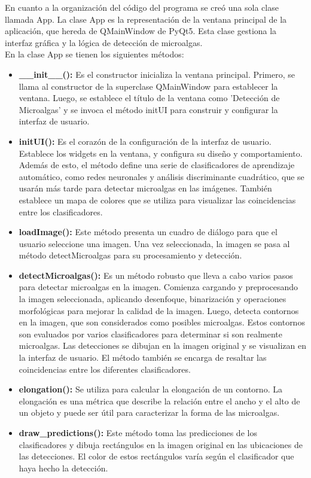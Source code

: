 \documentclass[conference]{IEEEtran}
\begin{document}
En cuanto a la organización del código del programa se creó una sola clase llamada App. La clase App es la representación de la ventana principal de la aplicación, que hereda de QMainWindow de PyQt5. Esta clase gestiona la interfaz gráfica y la lógica de detección de microalgas.\\
En la clase App se tienen los siguientes métodos:
\begin{itemize}
    \item \textbf{\_\_init\_\_(): }Es el constructor inicializa la ventana principal. Primero, se llama al constructor de la superclase QMainWindow para establecer la ventana. Luego, se establece el título de la ventana como 'Detección de Microalgas' y se invoca el método initUI para construir y configurar la interfaz de usuario.
    \item \textbf{initUI(): }Es el corazón de la configuración de la interfaz de usuario. Establece los  widgets en la ventana, y configura su diseño y comportamiento. Además de esto, el método define una serie de clasificadores de aprendizaje automático, como redes neuronales y análisis discriminante cuadrático, que se usarán más tarde para detectar microalgas en las imágenes. También establece un mapa de colores que se utiliza para visualizar las coincidencias entre los clasificadores.
    \item \textbf{loadImage(): } Este método presenta un cuadro de diálogo para que el usuario seleccione una imagen. Una vez seleccionada, la imagen se pasa al método detectMicroalgas para su procesamiento y detección.
    \item \textbf{detectMicroalgas(): }Es un método robusto que lleva a cabo varios pasos para detectar microalgas en la imagen. Comienza cargando y preprocesando la imagen seleccionada, aplicando desenfoque, binarización y operaciones morfológicas para mejorar la calidad de la imagen. Luego, detecta contornos en la imagen, que son considerados como posibles microalgas. Estos contornos son evaluados por varios clasificadores para determinar si son realmente microalgas. Las detecciones se dibujan en la imagen original y se visualizan en la interfaz de usuario. El método también se encarga de resaltar las coincidencias entre los diferentes clasificadores.
    \item \textbf{elongation(): }Se utiliza para calcular la elongación de un contorno. La elongación es una métrica que describe la relación entre el ancho y el alto de un objeto y puede ser útil para caracterizar la forma de las microalgas.
    \item \textbf{draw\_predictions(): }Este método toma las predicciones de los clasificadores y dibuja rectángulos en la imagen original en las ubicaciones de las detecciones. El color de estos rectángulos varía según el clasificador que haya hecho la detección.
\end{itemize}
\end{document}
